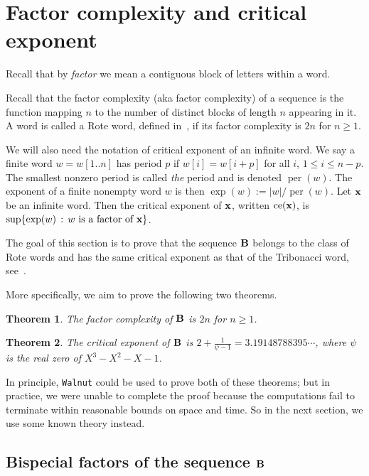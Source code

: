 \documentclass[
final
]{dmtcs-episciences}
\def\suchthat{\, : \,}
\DeclareMathOperator{\per}{per}
\DeclareMathOperator{\ce}{ce}
\theoremstyle{plain}
\newtheorem{theorem}{Theorem}
\theoremstyle{definition}
\theoremstyle{remark}
\begin{document}
\section{Factor complexity and critical exponent}

Recall that by {\it factor\/} we mean  a contiguous block of letters within a word.

Recall that the factor complexity (aka factor complexity) of a sequence is the function mapping $n$ to the number of distinct blocks of length $n$ appearing in it.  A word is called a Rote word, defined in~\cite{Rote:1994}, if its factor complexity is $2n$ for $n \geq 1$.

We will also need the notation of critical exponent of an infinite word.
We say a finite word $w = w[1..n]$ has period $p$
if $w[i]=w[i+p]$ for all $i$, $1 \leq i \leq n-p$.  The smallest nonzero period is called {\it the\/} period and is denoted $\per(w)$.  The exponent of a finite nonempty word $w$ is then
$\exp(w) := |w|/\per(w)$.  Let $\bf x$ be an infinite word.  Then the critical exponent of $\bf x$, written $\ce({\bf x})$, is $\sup \{ \exp(w) \suchthat
w \text{ is a factor of {\bf x}} \}$.


The goal of this section is to prove that the sequence $\bf B$ belongs to the class of Rote words and has the same critical exponent as that of the Tribonacci word, see~\cite{Tan&Wen:2007}. 

More specifically, we aim to prove the following two theorems.

\begin{theorem}\label{thm: complexity}
The factor complexity of $\bf B$ is $2n$ for $n \geq 1$.
\end{theorem}

\begin{theorem}\label{thm: critical_exponent}
The critical exponent of $\bf B$ is $2+\frac{1}{\psi-1} = 3.19148788395\cdots$,
where $\psi$ is the real zero of $X^3-X^2-X-1$.
\end{theorem}

In principle, {\tt Walnut} could be used to prove both of these theorems; but in practice, we were unable to complete the proof because the computations fail to terminate within reasonable bounds on space and time.  So in the next section, we use some known theory instead.

\subsection{Bispecial factors of the sequence $\bf B$}
\end{document}
